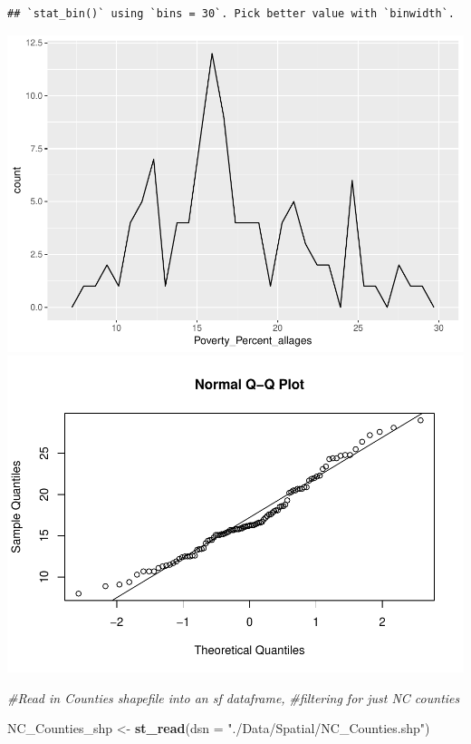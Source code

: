 \documentclass[12pt,]{article}
\newenvironment{Shaded}{\begin{snugshade}}{\end{snugshade}}
\newcommand{\KeywordTok}[1]{\textcolor[rgb]{0.13,0.29,0.53}{\textbf{#1}}}
\newcommand{\DataTypeTok}[1]{\textcolor[rgb]{0.13,0.29,0.53}{#1}}
\newcommand{\StringTok}[1]{\textcolor[rgb]{0.31,0.60,0.02}{#1}}
\newcommand{\CommentTok}[1]{\textcolor[rgb]{0.56,0.35,0.01}{\textit{#1}}}
\newcommand{\NormalTok}[1]{#1}
\begin{document}
\begin{verbatim}
## `stat_bin()` using `bins = 30`. Pick better value with `binwidth`.
\end{verbatim}

\includegraphics{Townsend_Project_Template_files/figure-latex/exploratory graphs-3.pdf}
\includegraphics{Townsend_Project_Template_files/figure-latex/exploratory graphs-4.pdf}

\begin{Shaded}
\begin{Highlighting}[]
\CommentTok{#Read in Counties shapefile into an sf dataframe, }
\CommentTok{#filtering for just NC counties}

\NormalTok{NC_Counties_shp <-}\StringTok{ }\KeywordTok{st_read}\NormalTok{(}\DataTypeTok{dsn =} \StringTok{"./Data/Spatial/NC_Counties.shp"}\NormalTok{) }
\end{Highlighting}
\end{Shaded}
\end{document}
